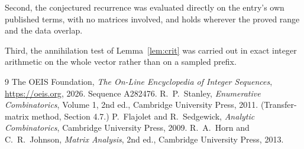 \documentclass[11pt,a4paper]{article}
\theoremstyle{plain}
\theoremstyle{definition}
\begin{document}
Second, the conjectured recurrence was evaluated directly on the entry's own published terms,
with no matrices involved, and holds wherever the proved range and the data overlap.

Third, the annihilation test of Lemma~\ref{lem:crit} was carried out in exact integer
arithmetic on the whole vector rather than on a sampled prefix.

\begin{thebibliography}{9}
 The OEIS Foundation, \emph{The On-Line Encyclopedia of Integer
Sequences}, \url{https://oeis.org}, 2026. Sequence A282476.
 R.~P.~Stanley, \emph{Enumerative Combinatorics}, Volume 1, 2nd ed.,
Cambridge University Press, 2011. (Transfer-matrix method, Section 4.7.)
 P.~Flajolet and R.~Sedgewick, \emph{Analytic Combinatorics}, Cambridge
University Press, 2009.
 R.~A.~Horn and C.~R.~Johnson, \emph{Matrix Analysis}, 2nd ed., Cambridge
University Press, 2013.
\end{thebibliography}
\end{document}
